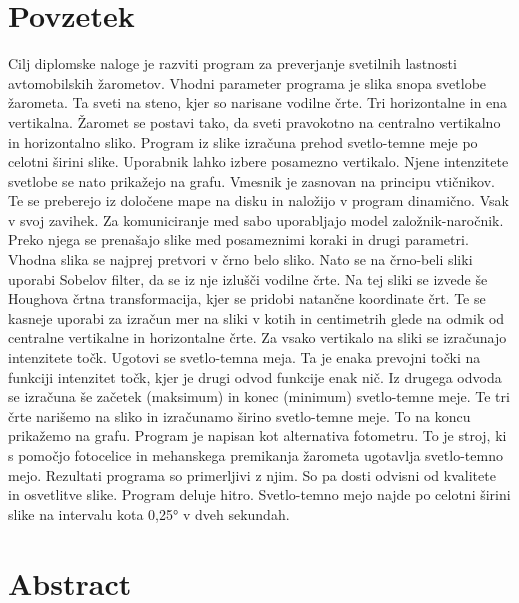\documentclass[oneside, a4paper, 12pt]{book}
\renewcommand{\chaptermark}[1]%
{\markboth{\MakeUppercase{\thechapter.\ #1}}{}} \renewcommand{\sectionmark}[1]%
\newcommand{\clearemptydoublepage}{\newpage{\pagestyle{empty}\cleardoublepage}}
\begin{document}
\clearemptydoublepage

\chapter*{Povzetek}
\chaptermark{}
Cilj diplomske naloge je razviti program za preverjanje svetilnih lastnosti avtomobilskih žarometov. Vhodni parameter programa je slika snopa svetlobe žarometa. Ta sveti na steno, kjer so narisane vodilne črte. Tri horizontalne in ena vertikalna. Žaromet se postavi tako, da sveti pravokotno na centralno vertikalno in horizontalno sliko. Program iz slike izračuna prehod svetlo-temne meje po celotni širini slike. Uporabnik lahko izbere posamezno vertikalo. Njene intenzitete svetlobe se nato prikažejo na grafu. Vmesnik je zasnovan na principu vtičnikov. Te se preberejo iz določene mape na disku in naložijo v program dinamično. Vsak v svoj zavihek. Za komuniciranje med sabo uporabljajo model založnik-naročnik. Preko njega se prenašajo slike med posameznimi koraki in drugi parametri. Vhodna slika se najprej pretvori v črno belo sliko. Nato se na črno-beli sliki uporabi Sobelov filter, da se iz nje izlušči vodilne črte. Na tej sliki se izvede še Houghova črtna transformacija, kjer se pridobi natančne koordinate črt. Te se kasneje uporabi za izračun mer na sliki v kotih in centimetrih glede na odmik od centralne vertikalne in horizontalne črte. Za vsako vertikalo na sliki se izračunajo intenzitete točk. Ugotovi se svetlo-temna meja. Ta je enaka prevojni točki na funkciji intenzitet točk, kjer je drugi odvod funkcije enak nič. Iz drugega odvoda se izračuna še začetek (maksimum) in konec (minimum) svetlo-temne meje. Te tri črte narišemo na sliko in izračunamo širino svetlo-temne meje. To na koncu prikažemo na grafu. Program je napisan kot alternativa fotometru. To je stroj, ki s pomočjo fotocelice in mehanskega premikanja žarometa ugotavlja svetlo-temno mejo. Rezultati programa so primerljivi z njim. So pa dosti odvisni od kvalitete in osvetlitve slike. Program deluje hitro. Svetlo-temno mejo najde po celotni širini slike na intervalu kota 0,25° v dveh sekundah.
\clearemptydoublepage

\chapter*{Abstract}
\end{document}
